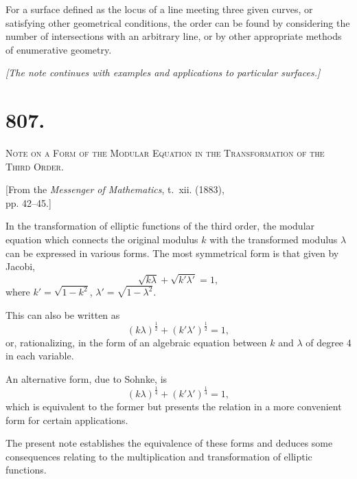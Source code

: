 \documentclass[11pt,a4paper]{article}
\theoremstyle{definition}
\theoremstyle{remark}
\begin{document}
For a surface defined as the locus of a line meeting three given curves, or satisfying other geometrical conditions, the order can be found by considering the number of intersections with an arbitrary line, or by other appropriate methods of enumerative geometry.

\vspace{0.5cm}
\noindent\textit{[The note continues with examples and applications to particular surfaces.]}
\vspace{0.5cm}



\newpage
\section*{807.}
\begin{center}
{\large\scshape Note on a Form of the Modular Equation in the Transformation of the Third Order.}
\end{center}

\begin{flushright}
\small[From the \textit{Messenger of Mathematics}, t.~xii. (1883),\\
pp. 42--45.]
\end{flushright}

In the transformation of elliptic functions of the third order, the modular equation which connects the original modulus $k$ with the transformed modulus $\lambda$ can be expressed in various forms. The most symmetrical form is that given by Jacobi,
\[
\sqrt{k\lambda} + \sqrt{k'\lambda'} = 1,
\]
where $k' = \sqrt{1 - k^2}$, $\lambda' = \sqrt{1 - \lambda^2}$.

This can also be written as
\[
(k\lambda)^{\frac{1}{2}} + (k'\lambda')^{\frac{1}{2}} = 1,
\]
or, rationalizing, in the form of an algebraic equation between $k$ and $\lambda$ of degree 4 in each variable.

An alternative form, due to Sohnke, is
\[
(k\lambda)^{\frac{1}{4}} + (k'\lambda')^{\frac{1}{4}} = 1,
\]
which is equivalent to the former but presents the relation in a more convenient form for certain applications.

The present note establishes the equivalence of these forms and deduces some consequences relating to the multiplication and transformation of elliptic functions.
\end{document}

